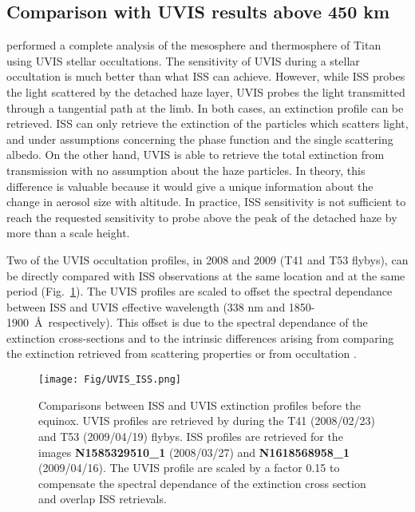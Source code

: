 \subsection{Comparison with UVIS results above 450 km}

\cite{Koskinen2011} performed a complete analysis of the mesosphere and thermosphere of Titan using UVIS stellar
occultations. The sensitivity of UVIS during a stellar occultation is much better than what ISS can achieve. However,
while ISS probes the light scattered by the detached haze layer, UVIS probes the light transmitted through a tangential
path at the limb. In both cases, an extinction profile can be retrieved. ISS can only retrieve the extinction of the
particles which scatters light, and under assumptions concerning the phase function and the single scattering albedo.
On the other hand, UVIS is able to retrieve the total extinction from transmission with no assumption about the haze
particles. In theory, this difference is valuable because it would give a unique information about the change in aerosol
size with altitude. In practice, ISS sensitivity is not sufficient to reach the requested sensitivity to probe above
the peak of the detached haze by more than a scale height.

Two of the UVIS occultation profiles, in 2008 and 2009 (T41 and T53 flybys), can be directly compared with ISS
observations at the same location and at the same period (Fig.~\ref{fig:uvis_iss}). The UVIS profiles are scaled to
offset the spectral dependance between ISS and UVIS effective wavelength (338 nm and 1850-1900~\AA~respectively).
This offset is due to the spectral dependance of the extinction cross-sections and to the intrinsic
differences arising from comparing the extinction retrieved from scattering properties or from occultation
\citep[see.][]{Cours2011}.

\begin{figure}[!ht]
    \centering
    \texttt{[image: Fig/UVIS\_ISS.png]}
    \caption[UVIS comparison]{Comparisons between ISS and UVIS extinction profiles before the equinox.
            UVIS profiles are retrieved by \cite{Koskinen2011} during the T41 (2008/02/23) and T53 (2009/04/19) flybys.
            ISS profiles are retrieved for the images \textbf{N1585329510\_1} (2008/03/27) and
            \textbf{N1618568958\_1} (2009/04/16).
            The UVIS profile are scaled by a factor 0.15 to compensate the spectral dependance of the extinction
            cross section and overlap ISS retrievals.}
    \label{fig:uvis_iss}
\end{figure}

